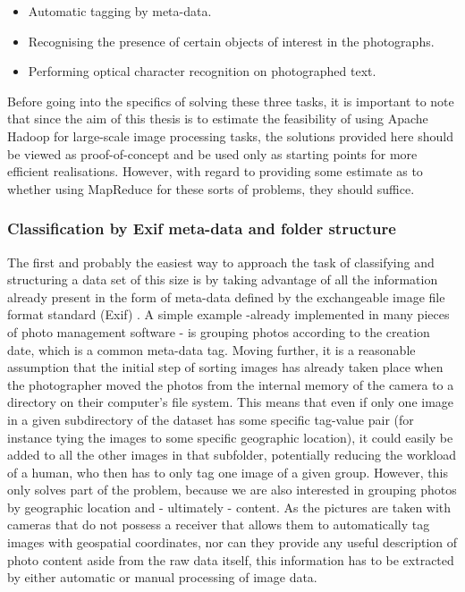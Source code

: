 \documentclass [12pt,a4paper]{report}
\begin{document}
\begin{itemize} 
\item Automatic tagging by meta-data.
\item Recognising the presence of certain objects of interest in the photographs.
\item Performing optical character recognition on photographed text.
\end{itemize} 

Before going into the specifics of solving these three tasks, it is important to note that since the aim of this thesis is to estimate the feasibility of using Apache Hadoop for large-scale image processing tasks, the solutions provided here should be viewed as proof-of-concept and be used only as starting points for more efficient realisations. However, with regard to providing some estimate as to whether using MapReduce for these sorts of problems, they should suffice.

\subsubsection{Classification by Exif meta-data and folder structure}

The first and probably the easiest way to approach the task of classifying and structuring a data set of this size is by taking advantage of all the information already present in the form of meta-data defined by the exchangeable image file format standard (Exif) \cite{japan2002jeita}. A simple example -already implemented in many pieces of photo management software - is grouping photos according to the creation date, which is a common meta-data tag. Moving further, it is a reasonable assumption that the initial step of sorting images has already taken place when the photographer moved the photos from the internal memory of the camera to a directory on their computer's file system. This means that even if only one image in a given subdirectory of the dataset has some specific tag-value pair (for instance tying the images to some specific geographic location), it could easily be added to all the other images in that subfolder, potentially reducing the workload of a human, who then has to only tag one image of a given group.
However, this only solves part of the problem, because we are also interested in grouping photos by geographic location and - ultimately - content. As the pictures are taken with cameras that do not possess a receiver that allows them to automatically tag images with geospatial coordinates, nor can they provide any useful description of photo content aside from the raw data itself, this information has to be extracted by either automatic or manual processing of image data. 
\end{document}
